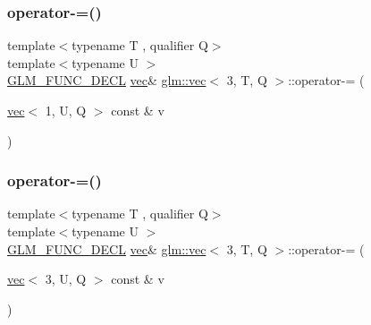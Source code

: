 \subsubsection{\texorpdfstring{operator-\/=()}{operator-=()}\hspace{0.1cm}{\footnotesize\ttfamily [2/6]}}
{\footnotesize\ttfamily template$<$typename T , qualifier Q$>$ \\
template$<$typename U $>$ \\
\mbox{\hyperlink{setup_8hpp_ab2d052de21a70539923e9bcbf6e83a51}{G\+L\+M\+\_\+\+F\+U\+N\+C\+\_\+\+D\+E\+CL}} \mbox{\hyperlink{structglm_1_1vec}{vec}}\& \mbox{\hyperlink{structglm_1_1vec}{glm\+::vec}}$<$ 3, T, Q $>$\+::operator-\/= (\begin{DoxyParamCaption}\item[{\mbox{\hyperlink{structglm_1_1vec}{vec}}$<$ 1, U, Q $>$ const \&}]{v }\end{DoxyParamCaption})}

\mbox{\label{structglm_1_1vec_3_013_00_01_t_00_01_q_01_4_af172872e811a8262f44dc83a9784354e}} 
\subsubsection{\texorpdfstring{operator-\/=()}{operator-=()}\hspace{0.1cm}{\footnotesize\ttfamily [3/6]}}
{\footnotesize\ttfamily template$<$typename T , qualifier Q$>$ \\
template$<$typename U $>$ \\
\mbox{\hyperlink{setup_8hpp_ab2d052de21a70539923e9bcbf6e83a51}{G\+L\+M\+\_\+\+F\+U\+N\+C\+\_\+\+D\+E\+CL}} \mbox{\hyperlink{structglm_1_1vec}{vec}}\& \mbox{\hyperlink{structglm_1_1vec}{glm\+::vec}}$<$ 3, T, Q $>$\+::operator-\/= (\begin{DoxyParamCaption}\item[{\mbox{\hyperlink{structglm_1_1vec}{vec}}$<$ 3, U, Q $>$ const \&}]{v }\end{DoxyParamCaption})}

\mbox{\label{structglm_1_1vec_3_013_00_01_t_00_01_q_01_4_a806d4a3b1fa79272d2b5ca58c62b95c1}} 
